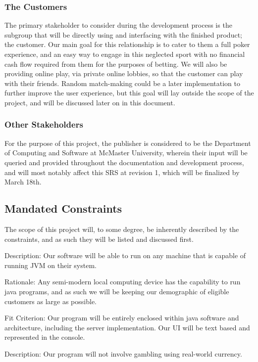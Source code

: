 \documentclass[12pt, titlepage]{article}
\begin{document}
\subsubsection{The Customers}
The primary stakeholder to consider during the development process is the subgroup that will be directly using and interfacing with the finished product; the customer. Our main goal for this relationship is to cater to them a full poker experience, and an easy way to engage in this neglected sport with no financial cash flow required from them for the purposes of betting. We will also be providing online play, via private online lobbies, so that the customer can play with their friends. Random match-making could be a later implementation to further improve the user experience, but this goal will lay outside the scope of the project, and will be discussed later on in this document.
\subsubsection{Other Stakeholders}
For the purpose of this project, the publisher is considered to be the Department of Computing and Software at McMaster University, wherein their input will be queried and provided throughout the documentation and development process, and will most notably affect this SRS at revision 1, which will be finalized by March 18th. 
\subsection{Mandated Constraints}
The scope of this project will, to some degree, be inherently described by the constraints, and as such they will be listed and discussed first. 

\bigskip

Description: Our software will be able to run on any machine that is capable of running JVM on their system.

Rationale: Any semi-modern local computing device has the capability to run java programs, and as such we will be keeping our demographic of eligible customers as large as possible.

Fit Criterion: Our program will be entirely enclosed within java software and architecture, including the server implementation. Our UI will be text based and represented in the console. 

\bigskip

Description: Our program will not involve gambling using real-world currency.
\end{document}
